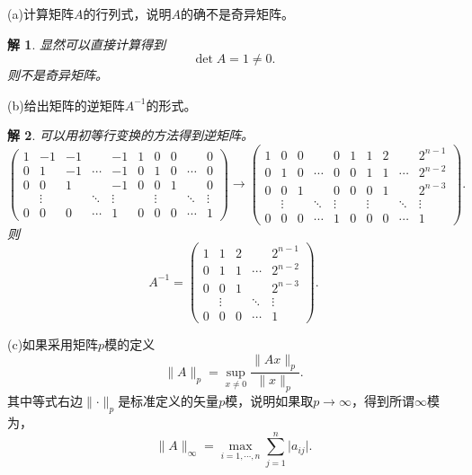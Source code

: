 \documentclass[10pt]{ctexart}
\newtheorem*{solution}{解}
\begin{document}
(a)计算矩阵$A$的行列式，说明$A$的确不是奇异矩阵。
\begin{solution}
    显然可以直接计算得到
    $$\det{A}=1\neq 0.$$
    则不是奇异矩阵。
\end{solution}
(b)给出矩阵的逆矩阵$A^{-1}$的形式。
\begin{solution}
    可以用初等行变换的方法得到逆矩阵。
    $$\begin{pmatrix}
        1 & -1 & -1 & & -1 & 1 & 0 & 0 & & 0\\
        0 & 1 & -1 &\cdots & -1 & 0 & 1 & 0 &\cdots& 0\\
        0 & 0 & 1 & & -1 & 0 & 0 & 1 & & 0\\
          & \vdots & & \ddots &\vdots& & \vdots & & \ddots &\vdots\\
        0 & 0 & 0 &\cdots & 1 & 0 & 0 & 0 &\cdots& 1
    \end{pmatrix}\rightarrow
    \begin{pmatrix}
        1 & 0 & 0 & & 0 & 1 & 1 & 2 & & 2^{n-1}\\
        0 & 1 & 0 &\cdots & 0 & 0 & 1 & 1 &\cdots& 2^{n-2}\\
        0 & 0 & 1 & & 0 & 0 & 0 & 1 & & 2^{n-3}\\
          & \vdots & & \ddots &\vdots& & \vdots & & \ddots &\vdots\\
        0 & 0 & 0 &\cdots & 1 & 0 & 0 & 0 &\cdots& 1
    \end{pmatrix}.$$
    则
    $$A^{-1}=
    \begin{pmatrix}
        1 & 1 & 2 & & 2^{n-1}\\
        0 & 1 & 1 &\cdots& 2^{n-2}\\
        0 & 0 & 1 & & 2^{n-3}\\
          &\vdots& & \ddots & \vdots\\
        0 & 0 & 0 &\cdots & 1
    \end{pmatrix}.$$
\end{solution}
(c)如果采用矩阵$p$模的定义
$$\lVert A\rVert_p=\sup\limits_{x\neq 0}{\frac{\lVert Ax\rVert_p}{\lVert x\rVert_p}}.$$
其中等式右边$\lVert\cdot\rVert_p$是标准定义的矢量$p$模，说明如果取$p\rightarrow\infty$，得到所谓$\infty$模为，
$$\lVert A\rVert_\infty=\max\limits_{i=1,\cdots,n}{\sum\limits_{j=1}^{n}\lvert a_{ij}\rvert}.$$
\end{document}
